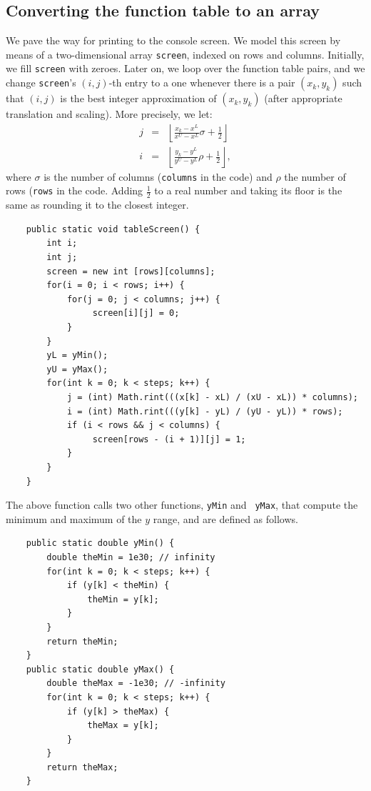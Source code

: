 \documentclass[a4paper]{book}
\theoremstyle{changebreak}                %
\begin{document}
\subsection{Converting the function table to an array}
We pave the way for printing to the
console screen. We model this screen by means of a
two-dimensional array {\tt screen},
indexed on rows and columns. Initially, we
fill {\tt screen} with zeroes. Later on, we loop over the
function table pairs, and we change {\tt screen}'s $(i,j)$-th entry to
a one whenever there is a pair $(x_k,y_k)$ such that $(i,j)$ is the
best integer approximation of $(x_k,y_k)$ (after appropriate
translation and scaling). More precisely, we let:
\begin{eqnarray*}
   j &=& \left\lfloor \frac{x_k-x^L}{x^U-x^L}\sigma +
   \frac{1}{2}\right\rfloor\\
   i &=& \left\lfloor \frac{y_k-y^L}{y^U-y^L}\rho +
   \frac{1}{2}\right\rfloor,
\end{eqnarray*}
where $\sigma$ is the number of columns ({\tt columns} in the code)
and $\rho$ the number of rows ({\tt rows} in the code. Adding
$\frac{1}{2}$ to a real number and taking its floor is
the same as rounding it to the closest
integer.
\begin{verbatim}
    public static void tableScreen() {
        int i;
        int j;
        screen = new int [rows][columns];
        for(i = 0; i < rows; i++) {
            for(j = 0; j < columns; j++) {
                 screen[i][j] = 0;
            }
        }
        yL = yMin();
        yU = yMax();
        for(int k = 0; k < steps; k++) {
            j = (int) Math.rint(((x[k] - xL) / (xU - xL)) * columns);
            i = (int) Math.rint(((y[k] - yL) / (yU - yL)) * rows);
            if (i < rows && j < columns) {
                 screen[rows - (i + 1)][j] = 1;
            }
        }
    }
\end{verbatim}
The above function calls two other functions, {\tt yMin} and {\tt
  yMax}, that compute the minimum and
maximum of the $y$ range, and are defined as follows.
\begin{verbatim}
    public static double yMin() {
        double theMin = 1e30; // infinity
        for(int k = 0; k < steps; k++) {
            if (y[k] < theMin) {
                theMin = y[k];
            }
        }
        return theMin;
    }
    public static double yMax() {
        double theMax = -1e30; // -infinity
        for(int k = 0; k < steps; k++) {
            if (y[k] > theMax) {
                theMax = y[k];
            }
        }
        return theMax;
    }
\end{verbatim}
\end{document}
